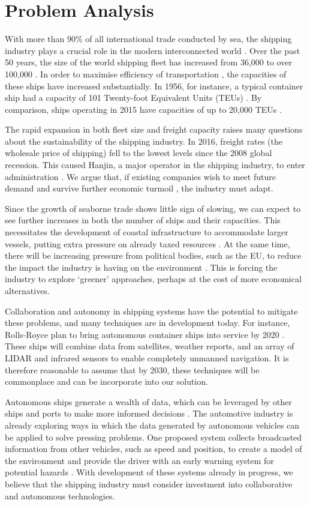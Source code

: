 \section{Problem Analysis}
\label{problem_analysis}

With more than 90\% of all international trade conducted by sea, the shipping industry plays a crucial role in the modern interconnected world \cite{IMOfacts}. Over the past 50 years, the size of the world shipping fleet has increased from 36,000 to over 100,000 \cite{IMOfacts}. In order to maximise efficiency of transportation \cite{sizematters}, the capacities of these ships have increased substantially. In 1956, for instance, a typical container ship had a capacity of 101 Twenty-foot Equivalent Units (TEUs) \cite{ftarticle}. By comparison, ships operating in 2015 have capacities of up to 20,000 TEUs \cite{sizematters}.

The rapid expansion in both fleet size and freight capacity raises many questions about the sustainability of the shipping industry. In 2016, freight rates (the wholesale price of shipping) fell to the lowest levels since the 2008 global recession. This caused Hanjin, a major operator in the shipping industry, to enter administration \cite{globalCrisis}. We argue that, if existing companies wish to meet future demand and survive further economic turmoil \cite{5trends}, the industry must adapt. 

Since the growth of seaborne trade shows little sign of slowing, we can expect to see further increases in both the number of ships and their capacities. This necessitates the development of coastal infrastructure to accommodate larger vessels, putting extra pressure on already taxed resources \cite{ftarticle}. At the same time, there will be increasing pressure from political bodies, such as the EU, to reduce the impact the industry is having on the environment \cite{eureport}. This is forcing the industry to explore `greener’ approaches, perhaps at the cost of more economical alternatives.

Collaboration and autonomy in shipping systems have the potential to mitigate these problems, and many techniques are in development today. For instance, Rolls-Royce plan to bring autonomous container ships into service by 2020 \cite{autoboats}. These ships will combine data from satellites, weather reports, and an array of LIDAR and infrared sensors to enable completely unmanned navigation. It is therefore reasonable to assume that by 2030, these techniques will be commonplace and can be incorporate into our solution.  

Autonomous ships generate a wealth of data, which can be leveraged by other ships and ports to make more informed decisions \cite{5trends}. The automotive industry is already exploring ways in which the data generated by autonomous vehicles can be applied to solve pressing problems. One proposed system collects broadcasted information from other vehicles, such as speed and position, to create a model of the environment and provide the driver with an early warning system for potential hazards \cite{c2c}. With development of these systems already in progress, we believe that the shipping industry must consider investment into collaborative and autonomous technologies.
